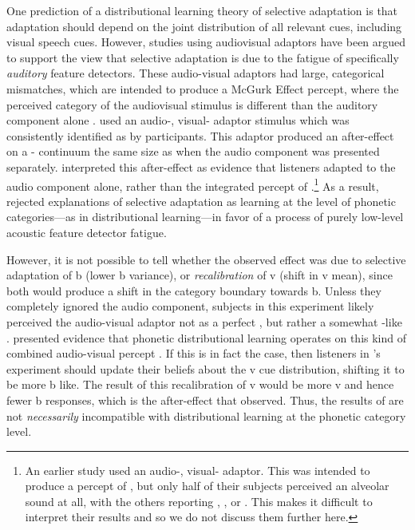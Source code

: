 One prediction of a distributional learning theory of selective adaptation is that adaptation should depend on the joint distribution of all relevant cues, including visual speech cues.  However, studies using audiovisual adaptors \cite{Roberts1981,Saldana1994} have been argued to support the view that selective adaptation is due to the fatigue of specifically \emph{auditory} feature detectors.  These audio-visual adaptors had large, categorical mismatches, which are intended to produce a McGurk Effect percept, where the perceived category of the audiovisual stimulus is different than the auditory component alone \cite{McGurk1976}.  \textcite{Saldana1994} used an audio-, visual- adaptor stimulus which was consistently identified as  by participants.  This adaptor produced an after-effect on a - continuum the same size as when the audio  component was presented separately.  \textcite{Saldana1994} interpreted this after-effect as evidence that listeners adapted to the audio component alone, rather than the integrated percept of .\footnote{An earlier study \protect\cite{Roberts1981} used an audio-, visual- adaptor.  This was intended to produce a percept of  \protect\autocite[as in][]{McGurk1976}, but only half of their subjects perceived an alveolar sound at all, with the others reporting , , or  \protect\cite{Saldana1994}.  This makes it difficult to interpret their results and so we do not discuss them further here.}  As a result, \textcite{Saldana1994} rejected explanations of selective adaptation as learning at the level of phonetic categories---as in distributional learning---in favor of a process of purely low-level acoustic feature detector fatigue.

However, it is not possible to tell whether the observed effect was due to selective adaptation of \ph b (lower \ph b variance), or \emph{recalibration} of \ph v (shift in \ph v mean), since both would produce a shift in the category boundary towards \ph b.  Unless they completely ignored the audio component, subjects in this experiment likely perceived the audio-visual adaptor not as a perfect , but rather a somewhat -like .  \textcite{Kleinschmidt2011} presented evidence that phonetic distributional learning operates on this kind of combined audio-visual percept \autocite[also cf. ][]{Bejjanki2011,Ernst2004}.  If this is in fact the case, then listeners in \citeauthor{Saldana1994}'s experiment should update their beliefs about the \ph v cue distribution, shifting it to be more \ph b like.  The result of this recalibration of \ph v would be more \ph v and hence fewer \ph b responses, which is the after-effect that \textcite{Saldana1994} observed.  Thus, the results of \textcite{Saldana1994} are not \emph{necessarily} incompatible with distributional learning at the phonetic category level. 

